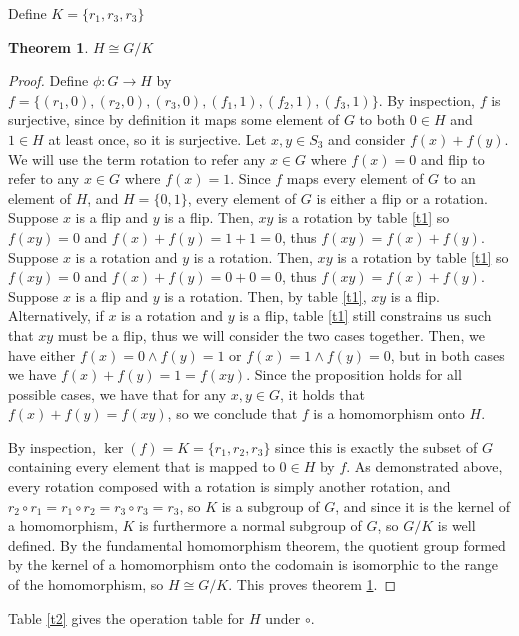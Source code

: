 \documentclass[12pt]{article}
\newtheorem{thm}{Theorem}
\begin{document}
Define $K = \{ r_1, r_3, r_3\}$

\begin{thm} \label{thm1}
	$H \cong G/K$
\end{thm}

\begin{proof}
	Define $\phi:G \to H$
	by $f = \{ (r_1, 0), (r_2, 0), (r_3,0), (f_1,1),(f_2,1),(f_3,1) \}$.
	By inspection, $f$ is surjective, since by definition it maps some element of $G$ to
	both $0 \in H$ and $1 \in H$ at least once, so it is surjective.
	Let $x,y \in S_3$ and consider $f(x) + f(y)$.
	We will use the term rotation to refer any $x \in G$
	where $f(x) = 0$ and flip to refer to any $x \in G$
	where $f(x) = 1$. Since $f$ maps every element of $G$ to an element of $H$,
	and $H = \{ 0, 1\}$, every element of $G$ is either a flip or a rotation.
	Suppose $x$ is a flip and $y$ is a flip. Then, $xy$ is a rotation by
	table \ref{t1} so $f(xy) = 0$ and $f(x) + f(y) = 1 + 1 = 0$,
	thus $f(xy) = f(x) + f(y)$.
	Suppose $x$ is a rotation and $y$ is a rotation. Then, $xy$ is a rotation
	by table \ref{t1} so $f(xy) = 0$ and $f(x) + f(y) = 0 + 0 = 0$,
	thus $f(xy) = f(x) + f(y)$.
	Suppose $x$ is a flip and $y$ is a rotation. Then, by table \ref{t1},
	$xy$ is a flip. Alternatively, if $x$ is a rotation and $y$ is a flip,
	table \ref{t1} still constrains us such that $xy$ must be a flip,
	thus we will consider the two cases together. Then,
	we have either $f(x) = 0 \land f(y) = 1$ or $f(x) = 1 \land f(y) = 0$,
	but in both cases we have $f(x) + f(y) = 1 = f(xy)$.
	Since the proposition holds for all possible cases,
	we have that for any $x,y \in G$, it holds that $f(x) + f(y) = f(xy)$,
	so we conclude that $f$ is a homomorphism onto $H$.

	By inspection, $\ker(f) = K = \{r_1, r_2, r_3\}$ since this is
	exactly the subset of $G$ containing every element that is mapped
	to $0 \in H$ by $f$. As demonstrated above, every rotation composed
	with a rotation is simply another rotation,
	and $r_2 \circ r_1 = r_1 \circ r_2 = r_3 \circ r_3 = r_3$,
	so $K$ is a subgroup of $G$, and since it is the kernel of a homomorphism,
	$K$ is furthermore a normal subgroup of $G$, so $G/K$ is well defined.
	By the fundamental homomorphism theorem, the quotient group formed by
	the kernel of a homomorphism onto the codomain
	is isomorphic to the range of the homomorphism, so $H \cong G/K$.
	This proves theorem \ref{thm1}.
\end{proof}

Table \ref{t2} gives the operation table for $H$ under $\circ$.
\end{document}
